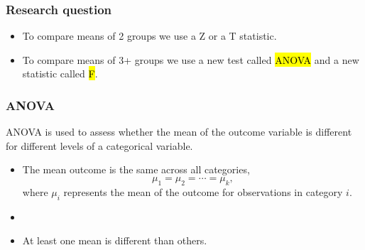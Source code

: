 \documentclass[slidestop,compress,mathserif]{beamer}
\begin{document}

\begin{frame}
\frametitle{Research question}


\vspace{0.5cm}

\pause

\begin{itemize}

\item To compare means of 2 groups we use a Z or a T statistic.

\pause

\item To compare means of 3+ groups we use a new test called \hl{ANOVA} and a new statistic called \hl{F}.

\end{itemize}

\end{frame}


\begin{frame}
\frametitle{ANOVA}

ANOVA is used to assess whether the mean of the outcome variable is different for different levels of a categorical variable.

\pause

\begin{itemize}
\item[]  The mean outcome is the same across all categories, 
\[\mu_1 = \mu_2 = \cdots = \mu_k, \]
where $\mu_i$ represents the mean of the outcome for observations in category $i$.
\item[]
\item[]  At least one mean is different than others.
\end{itemize}

\end{frame}

\end{document}
